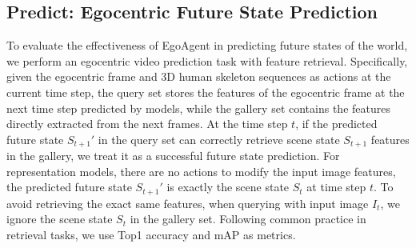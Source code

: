 \subsection{Predict: Egocentric Future State Prediction} 
To evaluate the effectiveness of EgoAgent in predicting future states of the world, we perform an egocentric video prediction task with feature retrieval. Specifically, given the egocentric frame and 3D human skeleton sequences as actions at the current time step, the query set stores the features of the egocentric frame at the next time step predicted by models, while the gallery set contains the features directly extracted from the next frames. At the time step $t$, if the predicted future state $S_{t+1}'$ in the query set can correctly retrieve scene state $S_{t+1}$ features in the gallery, we 
treat it as a successful future state prediction.
For representation models, there are no actions to modify the input image features, the predicted future state $S_{t+1}'$ is exactly the scene state $S_{t}$ at time step $t$. To avoid retrieving the exact same features, when querying with input image $I_t$, we ignore the scene state $S_{t}$ in the gallery set.  
Following common practice in retrieval tasks, we use Top1 accuracy and mAP as metrics. 

